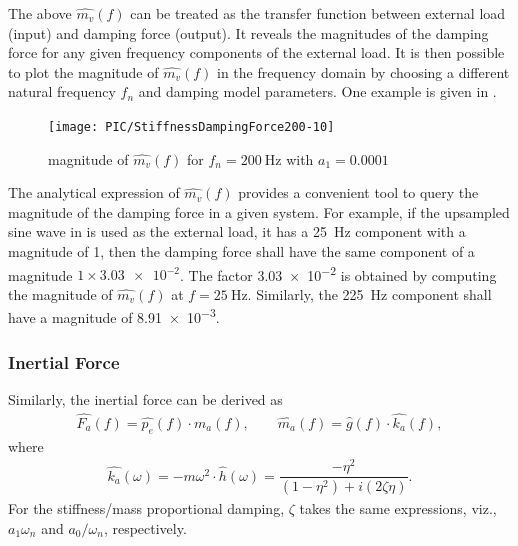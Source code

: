 The above $\hat{m_v}\left(f\right)$ can be treated as the transfer function between external load (input) and damping force (output). It reveals the magnitudes of the damping force for any given frequency components of the external load. It is then possible to plot the magnitude of $\hat{m_v}\left(f\right)$ in the frequency domain by choosing a different natural frequency $f_n$ and damping model parameters. One example is given in .
\begin{figure}[htb!]
\centering
\texttt{[image: PIC/StiffnessDampingForce200-10]}
\caption{magnitude of $\hat{m_v}\left(f\right)$ for $f_n=\SI{200}{\hertz}$ with $a_1=0.0001$}\label{fig:k_proportional_damping}
\end{figure}
The analytical expression of $\hat{m_v}\left(f\right)$ provides a convenient tool to query the magnitude of the damping force in a given system. For example, if the upsampled sine wave in  is used as the external load, it has a \SI{25}{\hertz} component with a magnitude of \num{1}, then the damping force shall have the same component of a magnitude $1\times\num{3.03e-2}$. The factor \num{3.03e-2} is obtained by computing the magnitude of $\hat{m_v}\left(f\right)$ at $f=\SI{25}{\hertz}$. Similarly, the \SI{225}{\hertz} component shall have a magnitude of \num{8.91e-3}.
\subsubsection{Inertial Force}
Similarly, the inertial force can be derived as
\begin{gather}
\hat{F_a}\left(f\right)=\hat{p_e}\left(f\right)\cdot\hat{m_a}\left(f\right),\qquad
\hat{m_a}\left(f\right)=\hat{g}\left(f\right)\cdot\hat{k_a}\left(f\right),
\end{gather}
where
\begin{gather}\label{eq:inertial_force}
\hat{k_a}\left(\omega\right)=-m\omega^2\cdot\hat{h}\left(\omega\right)=\dfrac{-\eta^2}{\left(1-\eta^2\right)+i\left(2\zeta\eta\right)}.
\end{gather}
For the stiffness/mass proportional damping, $\zeta$ takes the same expressions, viz., $a_1\omega_n$ and $a_0/\omega_n$, respectively.
